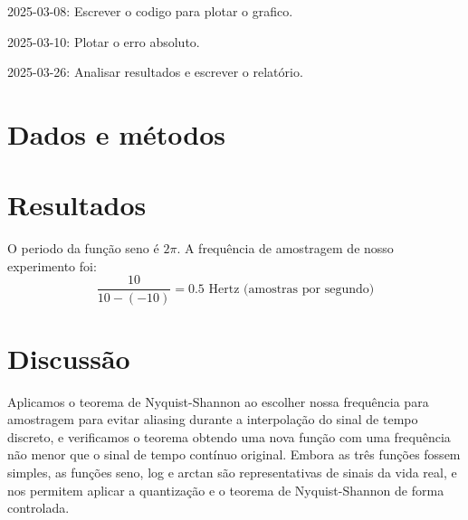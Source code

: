 \documentclass{article}
\begin{document}
2025-03-08: Escrever o codigo para plotar o grafico.  

2025-03-10: Plotar o erro absoluto.  

2025-03-26: Analisar resultados e escrever o relatório.  

\section{Dados e métodos}

\section{Resultados}

O periodo da função seno é $2\pi$. A frequência de amostragem de nosso experimento foi:  
$$\displaystyle\frac{10}{10-(-10)} = 0.5 \text{ Hertz (amostras por segundo)}$$

\section{Discussão}

Aplicamos o teorema de Nyquist-Shannon ao escolher nossa frequência para amostragem para evitar aliasing durante a interpolação do sinal de tempo discreto, e verificamos o teorema obtendo uma nova função com uma frequência não menor que o sinal de tempo contínuo original.
Embora as três funções fossem simples, as funções seno, log e arctan são representativas de sinais da vida real, e nos permitem aplicar a quantização e o teorema de Nyquist-Shannon de forma controlada.
\end{document}
